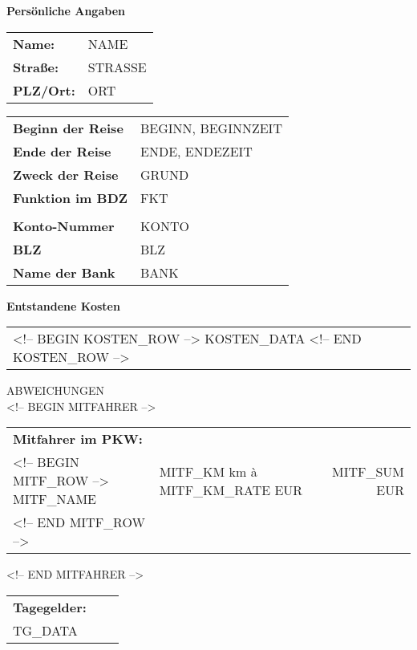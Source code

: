 \documentclass[a4paper,12pt]{dinbrief}
\begin{document}
\subject{\textbf{\sffamily Reisekostenabrechnung {NAME} {BEGINN},{BEGINNZEIT}-{ENDE},{ENDEZEIT} } }
\setaddressheight{3cm}
\begin{letter}

%

\textbf{Persönliche Angaben}
\begin{tabular}[t]{ll}
\textbf{Name:} & {NAME} \\
\textbf{Straße:} & {STRASSE} \\
\textbf{PLZ/Ort:} & {ORT} \\
\end{tabular}
\vspace{2cm}
\begin{tabular}[t]{ll}
\textbf{Beginn der Reise} & {BEGINN}, {BEGINNZEIT} \\
\textbf{Ende der Reise} & {ENDE}, {ENDEZEIT} \\
\textbf{Zweck der Reise} & {GRUND} \\
\textbf{Funktion im BDZ} &  {FKT} \\
\\
\textbf{Konto-Nummer} & {KONTO} \\
\textbf{ BLZ } & {BLZ} \\
\textbf{Name der Bank} & {BANK} \\
\end{tabular}

\textbf{Entstandene Kosten}\\
\begin{tabular}[t]{lll}
<!-- BEGIN KOSTEN_ROW -->
{KOSTEN_DATA}
<!-- END KOSTEN_ROW -->
\end{tabular}

{ABWEICHUNGEN} \\

<!-- BEGIN MITFAHRER -->
\begin{tabular}[t]{llr}
\textbf{Mitfahrer im PKW:}\\
<!-- BEGIN MITF_ROW -->
{MITF_NAME} & {MITF_KM} km à {MITF_KM_RATE} EUR & {MITF_SUM} EUR\\
<!-- END MITF_ROW -->
\end{tabular}
<!-- END MITFAHRER -->
\begin{tabular}[t]{llr}
\textbf{Tagegelder:}\\
{TG_DATA}
\end{tabular}
\end{letter}
\end{document}
